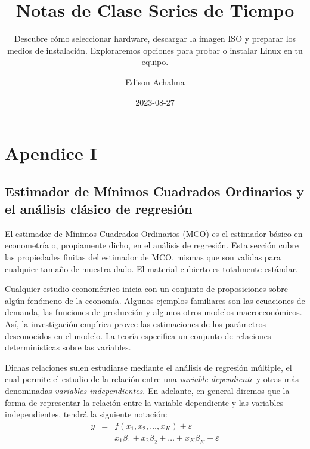 \documentclass[
  a4paper,
]{article}
\title{Notas de Clase Series de Tiempo}
\subtitle{Descubre cómo seleccionar hardware, descargar la imagen ISO y
preparar los medios de instalación. Exploraremos opciones para probar o
instalar Linux en tu equipo.}
\author{Edison Achalma}
\date{2023-08-27}
\begin{document}
\maketitle
\ifdefined\Shaded\renewenvironment{Shaded}{\begin{tcolorbox}[breakable, interior hidden, boxrule=0pt, frame hidden, sharp corners, borderline west={3pt}{0pt}{shadecolor}, enhanced]}{\end{tcolorbox}}\fi

\hypertarget{apendice-i}{%
\section{Apendice I}\label{apendice-i}}

\hypertarget{estimador-de-muxednimos-cuadrados-ordinarios-y-el-anuxe1lisis-cluxe1sico-de-regresiuxf3n}{%
\subsection{Estimador de Mínimos Cuadrados Ordinarios y el análisis
clásico de
regresión}\label{estimador-de-muxednimos-cuadrados-ordinarios-y-el-anuxe1lisis-cluxe1sico-de-regresiuxf3n}}

El estimador de Mínimos Cuadrados Ordinarios (MCO) es el estimador
básico en econometría o, propiamente dicho, en el análisis de regresión.
Esta sección cubre las propiedades finitas del estimador de MCO, mismas
que son validas para cualquier tamaño de muestra dado. El material
cubierto es totalmente estándar.

Cualquier estudio econométrico inicia con un conjunto de proposiciones
sobre algún fenómeno de la economía. Algunos ejemplos familiares son las
ecuaciones de demanda, las funciones de producción y algunos otros
modelos macroeconómicos. Así, la investigación empírica provee las
estimaciones de los parámetros desconocidos en el modelo. La teoría
especifica un conjunto de relaciones determinísticas sobre las
variables.

Dichas relaciones sulen estudiarse mediante el análisis de regresión
múltiple, el cual permite el estudio de la relación entre una
\emph{variable dependiente} y otras más denominadas \emph{variables
independientes}. En adelante, en general diremos que la forma de
representar la relación entre la variable dependiente y las variables
independientes, tendrá la siguiente notación: \begin{eqnarray}
    y & = & f(x_1, x_2, \ldots , x_K) + \varepsilon \nonumber \\
    & = & x_1\beta_1 + x_2\beta_2 + \ldots + x_K\beta_K + \varepsilon
\end{eqnarray}
\end{document}
